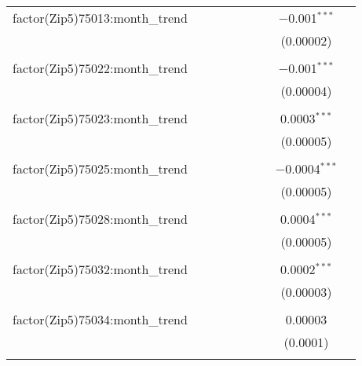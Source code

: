 \begin{table}[H]
{\begin{tabular}{@{\extracolsep{5pt}}lcccccccc}
  factor(Zip5)75013:month\_trend &  &  &  &  &  &  & $-$0.001$^{***}$ &  \\  

   &  &  &  &  &  &  & (0.00002) &  \\  

   & & & & & & & & \\  

  factor(Zip5)75022:month\_trend &  &  &  &  &  &  & $-$0.001$^{***}$ &  \\  

   &  &  &  &  &  &  & (0.00004) &  \\  

   & & & & & & & & \\  

  factor(Zip5)75023:month\_trend &  &  &  &  &  &  & 0.0003$^{***}$ &  \\  

   &  &  &  &  &  &  & (0.00005) &  \\  

   & & & & & & & & \\  

  factor(Zip5)75025:month\_trend &  &  &  &  &  &  & $-$0.0004$^{***}$ &  \\  

   &  &  &  &  &  &  & (0.00005) &  \\  

   & & & & & & & & \\  

  factor(Zip5)75028:month\_trend &  &  &  &  &  &  & 0.0004$^{***}$ &  \\  

   &  &  &  &  &  &  & (0.00005) &  \\  

   & & & & & & & & \\  

  factor(Zip5)75032:month\_trend &  &  &  &  &  &  & 0.0002$^{***}$ &  \\  

   &  &  &  &  &  &  & (0.00003) &  \\  

   & & & & & & & & \\  

  factor(Zip5)75034:month\_trend &  &  &  &  &  &  & 0.00003 &  \\  

   &  &  &  &  &  &  & (0.0001) &  \\  

   & & & & & & & & \\  


\end{tabular}}
\end{table}
